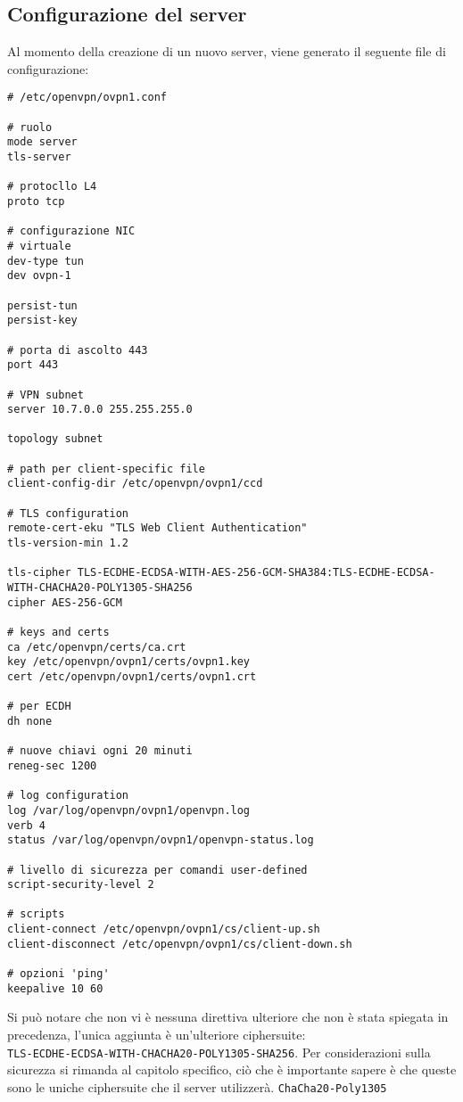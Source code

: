 \subsection{Configurazione del server}
Al momento della creazione di un nuovo server, viene generato il seguente file
di configurazione:
\begin{verbatim}
# /etc/openvpn/ovpn1.conf

# ruolo
mode server
tls-server

# protocllo L4
proto tcp

# configurazione NIC
# virtuale
dev-type tun
dev ovpn-1

persist-tun
persist-key

# porta di ascolto 443
port 443

# VPN subnet
server 10.7.0.0 255.255.255.0

topology subnet

# path per client-specific file
client-config-dir /etc/openvpn/ovpn1/ccd

# TLS configuration
remote-cert-eku "TLS Web Client Authentication"
tls-version-min 1.2

tls-cipher TLS-ECDHE-ECDSA-WITH-AES-256-GCM-SHA384:TLS-ECDHE-ECDSA-WITH-CHACHA20-POLY1305-SHA256
cipher AES-256-GCM

# keys and certs
ca /etc/openvpn/certs/ca.crt
key /etc/openvpn/ovpn1/certs/ovpn1.key
cert /etc/openvpn/ovpn1/certs/ovpn1.crt

# per ECDH
dh none

# nuove chiavi ogni 20 minuti
reneg-sec 1200

# log configuration
log /var/log/openvpn/ovpn1/openvpn.log
verb 4
status /var/log/openvpn/ovpn1/openvpn-status.log

# livello di sicurezza per comandi user-defined
script-security-level 2

# scripts
client-connect /etc/openvpn/ovpn1/cs/client-up.sh
client-disconnect /etc/openvpn/ovpn1/cs/client-down.sh

# opzioni 'ping'
keepalive 10 60
\end{verbatim}
Si può notare che non vi è nessuna direttiva ulteriore che non è stata spiegata in
precedenza, l'unica aggiunta è un'ulteriore ciphersuite:\\
\texttt{TLS-ECDHE-ECDSA-WITH-CHACHA20-POLY1305-SHA256}. Per considerazioni sulla
sicurezza si rimanda al capitolo specifico, ciò che è importante sapere è che
queste sono le uniche ciphersuite che il server utilizzerà. \texttt{ChaCha20-Poly1305}
